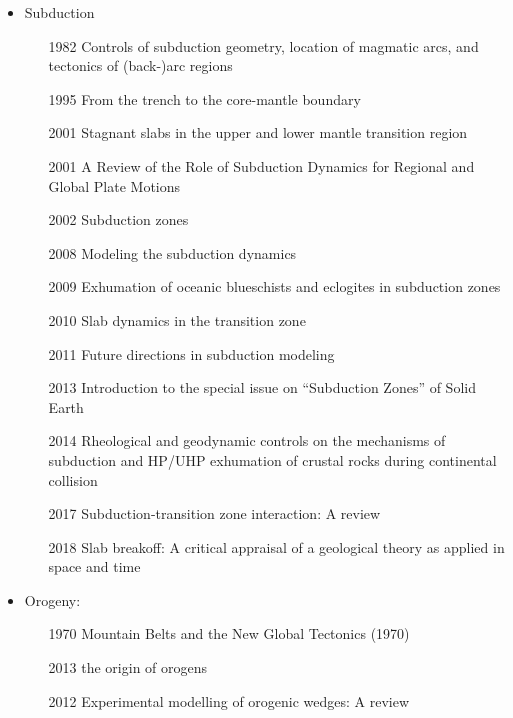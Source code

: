 \begin{itemize}

\item Subduction
   \begin{itemize}
   \item [1982] Controls of subduction geometry, location of magmatic arcs, 
         and tectonics of (back-)arc regions \cite{crpi82}
   \item [1995] From the trench to the core-mantle boundary \cite{kinc95}
   \item [2001] Stagnant slabs in the upper and lower mantle transition region \cite{fuwo01}
   \item [2001] A Review of the Role of Subduction Dynamics for Regional and Global Plate Motions \cite{befa09}
   \item [2002] Subduction zones \cite{ster02}
   \item [2008] Modeling the subduction dynamics \cite{bill08}
   \item [2009] Exhumation of oceanic blueschists and eclogites in subduction zones \cite{agyj09}
   \item [2010] Slab dynamics in the transition zone \cite{bill10}
   \item [2011] Future directions in subduction modeling \cite{gery11}
   \item [2013] Introduction to the special issue on “Subduction Zones” of Solid Earth \cite{bufv13}
   \item [2014] Rheological and geodynamic controls on the mechanisms of subduction and HP/UHP exhumation 
                of crustal rocks during continental collision \cite{bufa14,bufy14b}
   \item [2017] Subduction-transition zone interaction: A review \cite{goav17}
   \item [2018] Slab breakoff: A critical appraisal of a geological theory as applied in space and time \cite{garm18}
   \end{itemize}

\item Orogeny:
   \begin{itemize}
   \item [1970] Mountain Belts and the New Global Tectonics (1970) \cite{debi70}
   \item [2013] the origin of orogens \cite{jabe13}
   \item [2012] Experimental modelling of orogenic wedges: A review \cite{grmd12} 
   \end{itemize}


\end{itemize}
